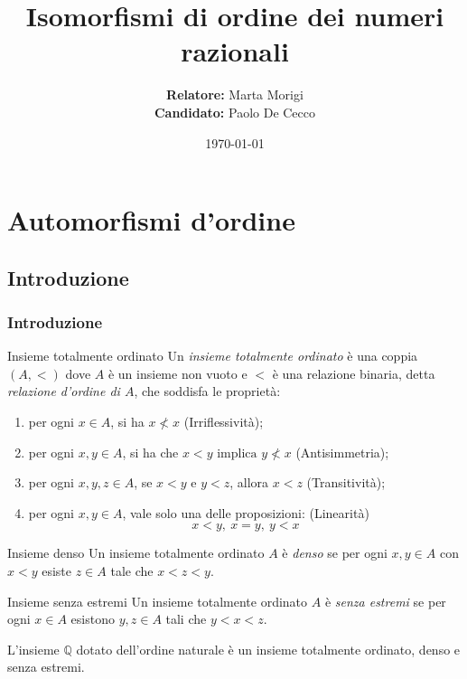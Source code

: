 \documentclass[italian, aspectratio=169,bookmarks=false]{beamer}
\author[Paolo De Cecco]{\textbf{Relatore:} Marta Morigi \\ \textbf{Candidato:} Paolo De Cecco}
\title{Isomorfismi di ordine dei numeri razionali}
\institute[Unibo]{Alma Mater Studiorum - Università di Bologna}
\date{\today}
\newcommand{\Q}{\mathbb{Q}} %
\newcommand{\0}{\setminus\{0\}} %
\theoremstyle{definition}
\theoremstyle{plain}
\begin{document}
\frame{\titlepage}
\section{Automorfismi d'ordine}
\subsection{Introduzione}
\begin{frame}
    \frametitle{Introduzione}
    \begin{block}{Insieme totalmente ordinato}
        Un \emph{insieme totalmente ordinato} è una coppia $(A,<)$ dove $A$ è un insieme non vuoto e $<$ è una relazione binaria, detta \emph{relazione d'ordine di $A$}, che soddisfa le proprietà:
        \begin{enumerate}
            \item per ogni $x \in A$, si ha $x \nless x$ (Irriflessività);
            \item per ogni $x,y \in A$, si ha che $x<y \mbox{ implica } y \nless x$ (Antisimmetria);
            \item per ogni $x,y,z \in A$, se $x<y \mbox{ e } y<z$, allora $x<z$ (Transitività);
            \item per ogni $x,y \in A$, vale solo una delle proposizioni: (Linearità)
            \[x<y,\medspace x=y,\medspace y<x\]
        \end{enumerate}
    \end{block}
\end{frame}
\begin{frame}
    \begin{block}{Insieme denso}
        Un insieme totalmente ordinato $A$ è \emph{denso} se per ogni $x,y \in A$ con $x<y$ esiste $z \in A$ tale che $x<z<y$.
    \end{block} \pause
    \begin{block}{Insieme senza estremi}
        Un insieme totalmente ordinato $A$ è \emph{senza estremi} se per ogni $x \in A$ esistono $y,z \in A$ tali che $y<x<z$.
    \end{block} \pause
    \begin{center}
            L'insieme $\Q$ dotato dell'ordine naturale è un insieme totalmente ordinato, denso e senza estremi.
    \end{center}
\end{frame}
\end{document}
